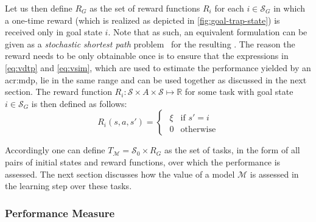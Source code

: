 Let us then define $R_G$ as the set of reward functions $R_i$ for each $i \in \mathcal{S}_G$ in which a one-time reward (which is realized as depicted in \autoref{fig:goal-trap-state}) is received only in goal state $i$.
Note that as such, an equivalent formulation can be given as a \textit{stochastic shortest path} problem~\cite{GuillotS17} for the resulting .
The reason the reward needs to be only obtainable once is to ensure that the expressions in \autoref{eq:vdtp} and \autoref{eq:vsim}, which are used to estimate the performance yielded by an \acrshort{acr:mdp}, lie in the same range and can be used together as discussed in the next section.
The reward function $R_i: \mathcal{S} \times A \times \mathcal{S} \mapsto \mathbb{R}$ for some task with goal state $i \in \mathcal{S}_G$ is then defined as follows:
\begin{equation}
R_i(s, a, s') = 
\begin{cases}
\hspace{4pt} \xi & \text{if } s' = i \\
\hspace{4pt} 0 & \text{otherwise}
\end{cases}
\end{equation}

Accordingly one can define $T_{\mathcal{M}} = \mathcal{S_0} \times R_G$ as the set of tasks, in the form of all pairs of initial states and reward functions, over which the performance is assessed.
The next section discusses how the value of a model $\mathcal{M}$ is assessed in the learning step over these tasks.

\newpage %

\subsubsection{Performance Measure}

